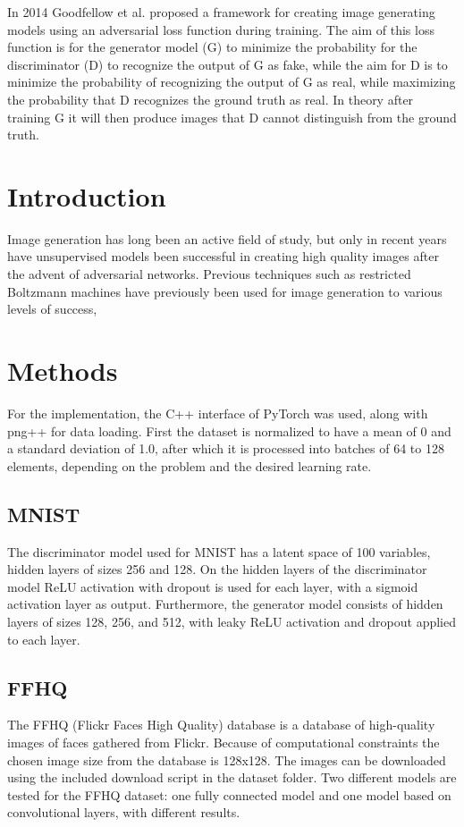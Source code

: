 
In 2014 Goodfellow et al. proposed a framework for creating image generating models
using an adversarial loss function during training.
The aim of this loss function is for the generator model (G) to minimize the probability
for the discriminator (D) to recognize the output of G as fake, while the aim for D
is to minimize the probability of recognizing the output of G as real, while maximizing the
probability that D recognizes the ground truth as real.
In theory after training G it will then produce images that D cannot distinguish from the ground
truth.

\section{Introduction}\label{sec:introduction}
Image generation has long been an active field of study, but only in recent years have unsupervised
models been successful in creating high quality images after the advent of adversarial networks.
Previous techniques such as restricted Boltzmann machines have previously been used for image
generation to various levels of success,

\section{Methods}\label{sec:methods}
For the implementation, the C++ interface of PyTorch was used, along with png++ for data loading.
First the dataset is normalized to have a mean of 0 and a standard deviation of 1.0, after which
it is processed into batches of 64 to 128 elements, depending on the problem and the desired
learning rate.

\subsection{MNIST}\label{subsec:mnist}
The discriminator model used for MNIST has a latent space of 100 variables, hidden layers of
sizes 256 and 128.
On the hidden layers of the discriminator model ReLU activation with dropout is used for each
layer, with a sigmoid activation layer as output.
Furthermore, the generator model consists of hidden layers of sizes 128, 256, and 512, with leaky
ReLU activation and dropout applied to each layer.

\subsection{FFHQ}\label{subsec:ffhq}
The FFHQ (Flickr Faces High Quality) database is a database of high-quality images of faces
gathered from Flickr.
Because of computational constraints the chosen image size from the database is 128x128.
The images can be downloaded using the included download script in the dataset folder.
Two different models are tested for the FFHQ dataset: one fully connected model and one model 
based on convolutional layers, with different results.

